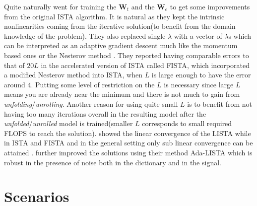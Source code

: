 Quite naturally \cite{Gregor2010} went for training the $\boldsymbol{W}_t$ and the $\boldsymbol{W}_e$ to get some improvements 
from the original \ac{ISTA}\cite{Daubechies2003} algorithm. It is natural as they kept the intrinsic 
nonlinearities coming from the iterative solution(to benefit from the domain knowledge of the problem). 
They also replaced single $\lambda$ with a vector of $\lambda$s which can be interpreted as an adaptive gradient descent 
much like the momentum based ones \cite{Boyd2004}\cite{Nocedal2006} or the Nesterov method \cite{Nesterov2004}\cite{Nesterov2018}. 
They reported having comparable errors to that of $20L$ in the accelerated version of 
\ac{ISTA}\cite{Daubechies2003} called \ac{FISTA}\cite{Beck2009}, which incorporated a modified Nesterov method 
\cite{Nesterov2004}\cite{Nesterov2018} into \ac{ISTA}, when $L$ is large enough to have the error around $4$. Putting some level of 
restriction on the $L$ is necessary since large $L$ means you are already near the minimum and there is not much to gain 
from \emph{unfolding}/\emph{unrolling}. Another reason for using quite small $L$ is to benefit from not having too many iterations 
overall in the resulting model after the \emph{unfolded}/\emph{unrolled} model is trained(smaller $L$ corresponds to 
small required \ac{FLOPS} to reach the solution). \cite{Chen2018} showed the 
linear convergence of the \ac{LISTA} while in \ac{ISTA} and \ac{FISTA} and in the general setting only sub linear convergence can be 
attained \cite{Daubechies2003}\cite{Beck2009}. \cite{Aberdam2020} further improved the solutions using their method \ac{Ada-LISTA} which 
is robust in the presence of noise both in the dictionary and in the signal.


\section{Scenarios}

